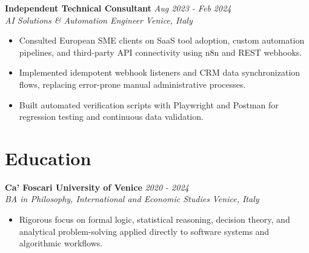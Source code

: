\documentclass[10pt,a4paper]{article}
\newcommand{\role}[4]{
  \vspace{2pt}
  \noindent\textbf{#1} \hfill \textit{#2} \\
  \textit{\color{text}#3} \hfill \textit{\color{text}#4}
  \vspace{1pt}
}
\begin{document}
\role{Independent Technical Consultant}{Aug 2023 - Feb 2024}{AI Solutions \& Automation Engineer}{Venice, Italy}
\begin{itemize}
  \item Consulted European SME clients on SaaS tool adoption, custom automation pipelines, and third-party API connectivity using n8n and REST webhooks.
  \item Implemented idempotent webhook listeners and CRM data synchronization flows, replacing error-prone manual administrative processes.
  \item Built automated verification scripts with Playwright and Postman for regression testing and continuous data validation.
\end{itemize}

\section{Education}

\role{Ca' Foscari University of Venice}{2020 - 2024}{BA in Philosophy, International and Economic Studies}{Venice, Italy}
\begin{itemize}
  \item Rigorous focus on formal logic, statistical reasoning, decision theory, and analytical problem-solving applied directly to software systems and algorithmic workflows.
\end{itemize}
\end{document}
